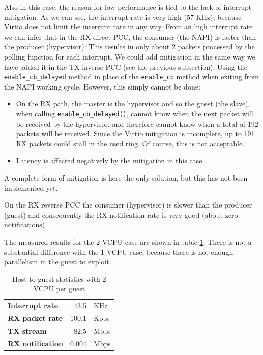 Also in this case, the reason for low performance is tied to the lack of interrupt mitigation. As we can see, the interrupt rate is
very high (57 KHz), because Virtio does not limit the interrupt rate in any way. From an high interrupt rate we can infer that in the 
RX direct PCC, the consumer (the NAPI) is faster than the producer (hypervisor): This results in only about 2
packets processed by the polling function for each interrupt.
We could add mitigation in the same way we have added it in the TX inverse PCC (see the previous subsection): Using
the \texttt{enable\_cb\_delayed} method in place of the \texttt{enable\_cb} method when exiting from the NAPI working cycle.
However, this simply cannot be done:
\begin{itemize}
  \item On the RX path, the master is the hypervisor and so the guest (the slave), when calling
	\texttt{enable\_cb\_delayed()}, cannot know when the next packet will be received by the hypervisor, and therefore cannot know
	when a total of 192 packets will be received. Since the Virtio mitigation is incomplete, up to 191 RX packets could stall
	in the used ring. Of course, this is not acceptable.
  \item Latency is affected negatively by the mitigation in this case.
\end{itemize}
A complete form of mitigation is here the only solution, but this has not been implemented yet.

\vspace{0.5cm}

On the RX reverse PCC the consumer (hypervisor) is slower than the producer (guest) and consequently the RX notification rate is
very good (about zero notifications).

\vspace{0.5cm}

The measured results for the 2-VCPU case are shown in table \ref{tab:virtionet-rx-g2hvcpu}. There is not a substantial difference with
the 1-VCPU case, because there is not enough parallelism in the guest to exploit.

\begin{table}
\begin{center}
\begin{tabular}{lrl}
\toprule
\textbf{Interrupt rate} & 43.5 & KHz\\
\textbf{RX packet rate} & 100.1 & Kpps\\
\textbf{TX stream} & 82.5 & Mbps\\
\textbf{RX notification} & 0.004 & Mbps\\
\bottomrule
\end{tabular}
\end{center}
\caption{Host to guest statistics with 2 VCPU per guest}
\label{tab:virtionet-rx-g2hvcpu}
\end{table}



